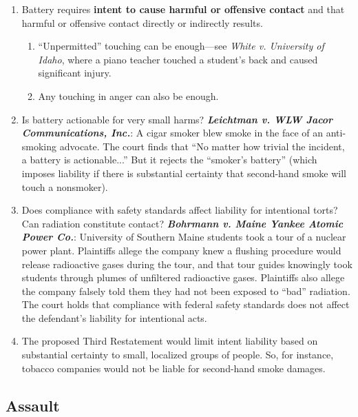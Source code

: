 \begin{enumerate}
    \item Battery requires \textbf{intent to cause harmful or offensive contact} and that harmful or offensive contact directly or indirectly results.
    \begin{enumerate}
        \item ``Unpermitted'' touching can be enough---see \emph{White v. University of Idaho}, where a piano teacher touched a student's back and caused significant injury.
        \item Any touching in anger can also be enough.
    \end{enumerate}
    \item Is battery actionable for very small harms? \textbf{\emph{Leichtman v. WLW Jacor Communications, Inc.}}: A cigar smoker blew smoke in the face of an anti-smoking advocate. The court finds that ``No matter how trivial the incident, a battery is actionable...'' But it rejects the ``smoker's battery'' (which imposes liability if there is substantial certainty that second-hand smoke will touch a nonsmoker).
    \item Does compliance with safety standards affect liability for intentional torts? Can radiation constitute contact? \textbf{\emph{Bohrmann v. Maine Yankee Atomic Power Co.}}: University of Southern Maine students took a tour of a nuclear power plant. Plaintiffs allege the company knew a flushing procedure would release radioactive gases during the tour, and that tour guides knowingly took students through plumes of unfiltered radioactive gases. Plaintiffs also allege the company falsely told them they had not been exposed to ``bad'' radiation. The court holds that compliance with federal safety standards does not affect the defendant's liability for intentional acts.
    \item The proposed Third Restatement would limit intent liability based on substantial certainty to small, localized groups of people. So, for instance, tobacco companies would not be liable for second-hand smoke damages.
\end{enumerate}

\subsection{Assault}

